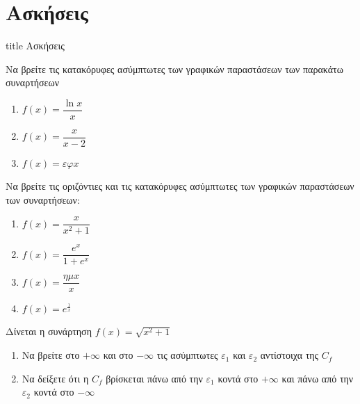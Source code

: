 \documentclass{presentation}
\begin{document}
\section{Ασκήσεις}

\begin{frame}[noframenumbering]
    \vfill
    \centering
    \begin{beamercolorbox}[sep=8pt,center,shadow=true,rounded=true]{title}
        Ασκήσεις
    \end{beamercolorbox}
    \vfill
\end{frame}

\begin{askisi}
    Να βρείτε τις κατακόρυφες ασύμπτωτες των γραφικών παραστάσεων των παρακάτω συναρτήσεων
    \begin{enumerate}
        \item<1-> $f(x)=\dfrac{\ln x}{x}$
        \item<2-> $f(x)=\dfrac{x}{x-2}$
        \item<3-> $f(x)=εφ x$
    \end{enumerate}

\end{askisi}

\begin{askisi}
    Να βρείτε τις οριζόντιες και τις κατακόρυφες ασύμπτωτες των γραφικών παραστάσεων των συναρτήσεων:
    \begin{enumerate}
        \item<1-> $f(x)=\dfrac{x}{x^2+1}$
        \item<2-> $f(x)=\dfrac{e^x}{1+e^x}$
        \item<3-> $f(x)=\dfrac{ημx}{x}$
        \item<4-> $f(x)=e^{\frac{1}{x}}$
    \end{enumerate}

\end{askisi}

\begin{askisi}
    Δίνεται η συνάρτηση $f(x)=\sqrt{x^2+1}$
    \begin{enumerate}
        \item<1-> Να βρείτε στο $+\infty$ και στο $-\infty$ τις ασύμπτωτες $ε_1$ και $ε_2$ αντίστοιχα της $C_f$
        \item<2-> Να δείξετε ότι η $C_f$ βρίσκεται πάνω από την $ε_1$ κοντά στο $+\infty$ και πάνω από την $ε_2$ κοντά στο $-\infty$
    \end{enumerate}

\end{askisi}
\end{document}
